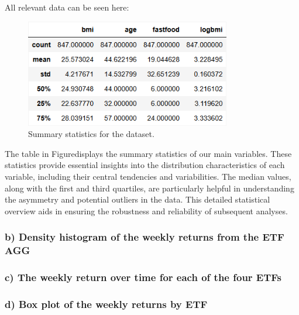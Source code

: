 \documentclass{rapport}
\begin{document}
All relevant data can be seen here:
\begin{figure}[H]
    \centering
    \includegraphics[width=0.8\textwidth]{summary_statistics.png}
    \caption{\small Summary statistics for the dataset.}
    \label{fig:summary_statistics}
\end{figure}

\noindent
The table in Figuredisplays the summary statistics of our main variables. These statistics provide essential insights into the distribution characteristics of each variable, including their central tendencies and variabilities. The median values, along with the first and third quartiles, are particularly helpful in understanding the asymmetry and potential outliers in the data. This detailed statistical overview aids in ensuring the robustness and reliability of subsequent analyses.





\subsubsection*{\textbf{b)} Density histogram of the weekly returns from the ETF AGG}
\noindent


\subsubsection*{\textbf{c)} The weekly return over time for each of the four ETFs}




\subsubsection*{\textbf{d)} Box plot of the weekly returns by ETF}
\end{document}
